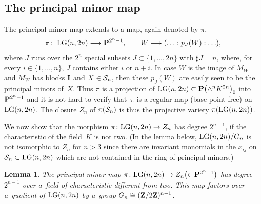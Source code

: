\documentclass[pdftex]{sigma}
\newcommand{\ZZ}{{\bf Z}}
\newcommand{\PP}{{\bf P}}
\newcommand{\cS}{{\cal S}}
\numberwithin{equation}{section}
\newtheorem{Lemma}[Theorem]{Lemma}
\begin{document}
\subsection{The principal minor map}\label{pmm}
The principal minor map extends to a map, again denoted by $\pi$,
\begin{gather*}
\pi\colon \ {\rm LG}(n,2n) \longrightarrow \PP^{2^n-1},\qquad W \longmapsto (\ldots:p_J(W):\ldots),
\end{gather*}
where $J$ runs over the $2^n$ special subsets $J\subset\{1,\ldots,2n\}$ with $\sharp J=n$, where, for every $i\in \{1,\ldots,n\}$, $J$ contains either $i$ or $n+i$. In case $W$ is the image of $M_W$ and $M_W$ has blocks ${\bf I}$ and $X\in\cS_n$, then these $p_J(W)$ are easily seen to be the principal minors of~$X$. Thus $\pi$ is a projection
of ${\rm LG}(n,2n)\subset \PP\big({\wedge}^nK^{2n}\big)_0$ into $\PP^{2^n-1}$ and it is not hard to verify that~$\pi$ is a regular map (base point free) on ${\rm LG}(n,2n)$. The closure $Z_n$ of $\pi(\cS_n)$ is thus the projective variety $\pi({\rm LG}(n,2n))$.

We now show that the morphism $\pi\colon {\rm LG}(n,2n)\rightarrow Z_n$ has degree $2^{n-1}$, if the characteristic of the field~$K$ is not two. (In the lemma below, ${\rm LG}(n,2n)/G_n$ is not isomorphic to $Z_n$ for $n>3$ since there are invariant monomials in the $x_{ij}$ on $\cS_n\subset {\rm LG}(n,2n)$ which are not contained in the ring of principal minors.)

\begin{Lemma}The principal minor map $\pi\colon {\rm LG}(n,2n)\rightarrow Z_n \big({\subset}\,\PP^{2^n-1}\big)$ has degree $2^{n-1}$ over a~field of characteristic different from two. This map factors over a~quotient of ${\rm LG}(n,2n)$ by a~group $G_n\cong (\ZZ/2\ZZ)^{n-1}$.
\end{Lemma}
\end{document}
